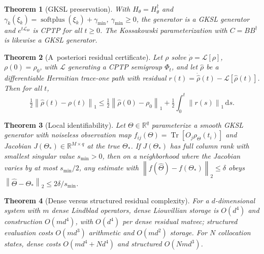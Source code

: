 \documentclass[11pt]{article}
\newtheorem{theorem}{Theorem}
\DeclareMathOperator{\Tr}{Tr}
\DeclareMathOperator{\softplus}{softplus}
\newcommand{\R}{\mathbb{R}}
\newcommand{\calL}{\mathcal{L}}
\newcommand{\dd}{\mathrm{d}}
\newcommand{\norm}[1]{\left\lVert #1 \right\rVert}
\newcommand{\rhohat}{\widehat{\rho}}
\newcommand{\Thetahat}{\widehat{\Theta}}
\begin{document}
\begin{theorem}[GKSL preservation]
\label{thm:cptp_generator}
With $H_\theta=H_\theta^\dagger$ and $\gamma_k(\xi_k)=\softplus(\xi_k)+\gamma_{\min}$, $\gamma_{\min}\ge0$, the generator is a GKSL generator and $e^{t\calL_\Theta}$ is CPTP for all $t\ge0$. The Kossakowski parameterization with $C=BB^\dagger$ is likewise a GKSL generator.
\end{theorem}

\begin{theorem}[A~posteriori residual certificate]
\label{thm:certificate}
Let $\rho$ solve $\dot\rho=\calL[\rho]$, $\rho(0)=\rho_0$, with $\calL$ generating a CPTP semigroup $\Phi_t$, and let $\rhohat$ be a differentiable Hermitian trace-one path with residual $r(t)=\dot\rhohat(t)-\calL[\rhohat(t)]$. Then for all $t$,
\begin{equation}
    \tfrac12\norm{\rhohat(t)-\rho(t)}_1\le\tfrac12\norm{\rhohat(0)-\rho_0}_1+\tfrac12\int_0^t\norm{r(s)}_1\,\dd s.
    \label{eq:certificate}
\end{equation}
\end{theorem}

\begin{theorem}[Local identifiability]
\label{thm:identifiability}
Let $\Theta\in\R^q$ parameterize a smooth GKSL generator with noiseless observation map $f_{ij}(\Theta)=\Tr[O_j\rho_\Theta(t_i)]$ and Jacobian $J(\Theta_*)\in\R^{M\times q}$ at the true $\Theta_*$. If $J(\Theta_*)$ has full column rank with smallest singular value $s_{\min}>0$, then on a neighborhood where the Jacobian varies by at most $s_{\min}/2$, any estimate with $\norm{f(\Thetahat)-f(\Theta_*)}_2\le\delta$ obeys $\norm{\Thetahat-\Theta_*}_2\le2\delta/s_{\min}$.
\end{theorem}

\begin{theorem}[Dense versus structured residual complexity]
\label{thm:compiler}
For a $d$-dimensional system with $m$ dense Lindblad operators, dense Liouvillian storage is $O(d^4)$ and construction $O(md^4)$, with $O(d^4)$ per dense residual matvec; structured evaluation costs $O(md^3)$ arithmetic and $O(md^2)$ storage. For $N$ collocation states, dense costs $O(md^4+Nd^4)$ and structured $O(Nmd^3)$.
\end{theorem}
\end{document}
